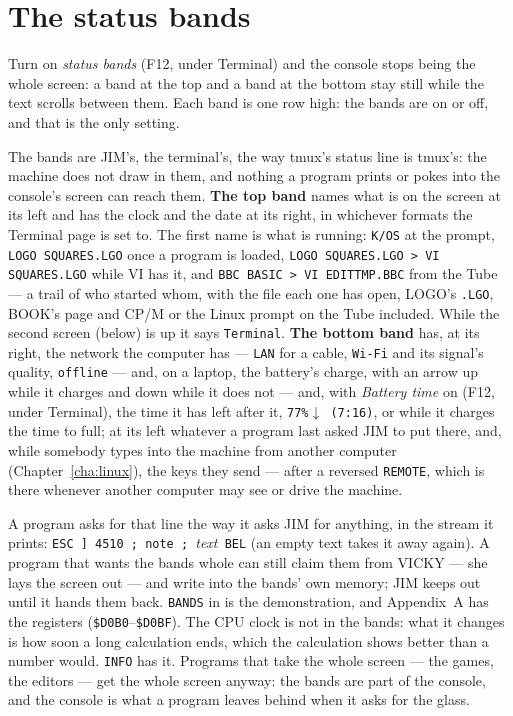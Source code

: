 \section{The status bands}\label{sec:bands}
Turn on \emph{status bands} (F12, under Terminal) and the console stops
being the whole screen: a band at the top and a band at the bottom stay
still while the text scrolls between them. Each band is one row high:
the bands are on or off, and that is the only setting.

The bands are JIM's, the terminal's, the way tmux's status line is
tmux's: the machine does not draw in them, and nothing a program prints or
pokes into the console's screen can reach them. \textbf{The top band}
names what is on the screen at its left and has the clock and the date at
its right, in whichever formats the Terminal page is set to. The first
name is what is running: \texttt{K/OS} at the prompt,
\texttt{LOGO SQUARES.LGO} once a program is loaded,
\texttt{LOGO SQUARES.LGO > VI SQUARES.LGO} while VI has it, and
\texttt{BBC BASIC > VI EDITTMP.BBC} from the Tube --- a trail of who
started whom, with the file each one has open, LOGO's \texttt{.LGO},
BOOK's page and CP/M or the Linux prompt on the Tube included. While the
second screen (below) is up it says \texttt{Terminal}.
\textbf{The bottom band} has, at its
right, the network the computer has --- \texttt{LAN} for a cable,
\texttt{Wi-Fi} and its signal's quality, \texttt{offline} --- and, on a
laptop, the battery's charge, with an arrow up while it charges and down
while it does not --- and, with \emph{Battery time} on (F12, under
Terminal), the time it has left after it, \texttt{77\%}$\downarrow$\texttt{ (7:16)},
or while it charges the time to full; at its left whatever a program last
asked JIM to put there, and, while somebody types into the machine from
another computer (Chapter~\ref{cha:linux}), the keys they send --- after a
reversed \texttt{REMOTE}, which is there whenever another computer may see
or drive the machine.

A program asks for that line the way it asks JIM for anything, in the
stream it prints: \verb|ESC ] 4510 ; note ; |\emph{text}\verb| BEL|
(an empty text takes it away again). A program that wants the bands
whole can still claim them from VICKY --- she lays the screen out --- and
write into the bands' own memory; JIM keeps out until it hands them back.
\verb|BANDS| in  is the demonstration, and Appendix~A has
the registers (\texttt{\$D0B0}--\texttt{\$D0BF}). The CPU clock is not in
the bands: what it changes is how soon a long calculation ends, which the
calculation shows better than a number would. \verb|INFO| has it.
Programs that take the whole screen --- the games, the editors --- get
the whole screen anyway: the bands are part of the console, and the
console is what a program leaves behind when it asks for the glass.

